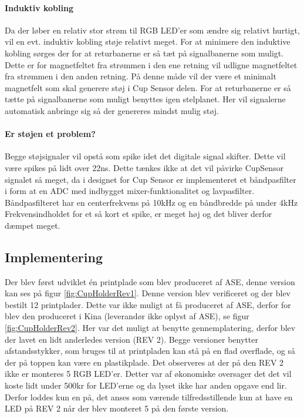 \documentclass[HardwareDesign/HardwareDesign_main.tex]{subfiles}
\begin{document}
\paragraph{Induktiv kobling} Da der løber en relativ stor strøm til RGB LED'er som ændre sig relativt hurtigt, vil en evt. induktiv kobling støje relativt meget. For at minimere den induktive kobling sørges der for at returbanerne er så tæt på signalbanerne som muligt. Dette er for magnetfeltet fra strømmen i den ene retning vil udligne magnetfeltet fra strømmen i den anden retning. På denne måde vil der være et minimalt magnetfelt som skal generere støj i Cup Sensor delen. For at returbanerne er så tætte på signalbanerne som muligt benyttes igen stelplanet. Her vil signalerne automatisk anbringe sig så der genereres mindst mulig støj.

\paragraph{Er støjen et problem?}
Begge støjsignaler vil opstå som spike idet det digitale signal skifter. Dette vil være spikes på lidt over 22ns. Dette tænkes ikke at det vil påvirke CupSensor signalet så meget, da i designet for Cup Sensor er implementeret et båndpasfilter i form at en ADC med indbygget mixer-funktionalitet og lavpasfilter. Båndpasfilteret har en centerfrekvens på 10kHz og en båndbredde på under 4kHz Frekvensindholdet for et så kort et spike, er meget høj og det bliver derfor dæmpet meget.

\subsection{Implementering}
Der blev først udviklet én printplade som blev produceret af ASE, denne version kan ses på figur \ref{fig:CupHolderRev1}. Denne version blev verificeret og der blev bestilt 12 printplader. Dette var ikke muligt at få produceret af ASE, derfor for blev den produceret i Kina (leverandør ikke oplyst af ASE), se figur \ref{fig:CupHolderRev2}. Her var det muligt at benytte gennemplatering, derfor blev der lavet en lidt anderledes version (REV 2). Begge versioner benytter afstandsstykker, som bruges til at printpladen kan stå på en flad overflade, og så der på toppen kan være en plastikplade. Det observeres at der på den REV 2 ikke er monteres 5 RGB LED'er. Detter var af økonomiske oversager det det vil koste lidt under 500kr for LED'erne og da lyset ikke har anden opgave end lir. Derfor loddes kun en på, det anses som værende tilfredsstillende kun at have en LED på REV 2 når der blev monteret 5 på den første version.
\end{document}
